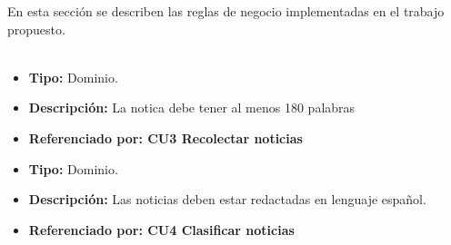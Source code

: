

En esta sección se describen las reglas de negocio implementadas en el trabajo propuesto.\\\\
\begin{itemize}
  \item \textbf{Tipo:} Dominio. 
  \item \textbf{Descripción:}  La notica debe tener al menos 180 palabras
  \item \textbf{Referenciado por: CU3 Recolectar noticias} 
\end{itemize}


\begin{itemize}
  \item \textbf{Tipo:} Dominio.  
  \item \textbf{Descripción:} Las noticias deben estar redactadas en lenguaje español.
  \item \textbf{Referenciado por: CU4 Clasificar noticias}  \\
\end{itemize}

